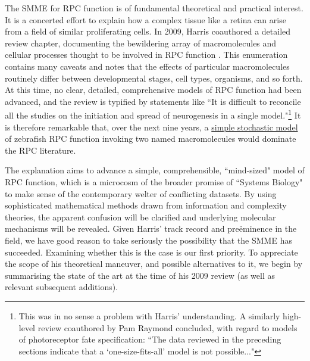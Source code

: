 The SMME for RPC function is of fundamental theoretical and practical interest. It is a concerted effort to explain how a complex tissue like a retina can arise from a field of similar proliferating cells. In 2009, Harris coauthored a detailed review chapter, documenting the bewildering array of macromolecules and cellular processes thought to be involved in RPC function \cite{Agathocleous2009}. This enumeration contains many caveats and notes that the effects of particular macromolecules routinely differ between developmental stages, cell types, organisms, and so forth. At this time, no clear, detailed, comprehensive models of RPC function had been advanced, and the review is typified by statements like ``It is difficult to reconcile all the studies on the initiation and spread of neurogenesis in a single model."\footnote{This was in no sense a problem with Harris' understanding. A similarly high-level review coauthored by Pam Raymond \cite{Adler2008} concluded, with regard to models of photoreceptor fate specification: ``The data reviewed in the preceding sections indicate that a ‘one-size-fits-all’ model is not possible..."} It is therefore remarkable that, over the next nine years, a \hyperref[ssec:SSM]{simple stochastic model} of zebrafish RPC function invoking two named macromolecules would dominate the RPC literature.

The explanation aims to advance a simple, comprehensible, ``mind-sized" model of RPC function, which is a microcosm of the broader promise of ``Systems Biology" to make sense of the contemporary welter of conflicting datasets. By using sophisticated mathematical methods drawn from information and complexity theories, the apparent confusion will be clarified and underlying molecular mechanisms will be revealed. Given Harris' track record and pre\"{e}minence in the field, we have good reason to take seriously the possibility that the SMME has succeeded. Examining whether this is the case is our first priority. To appreciate the scope of his theoretical maneuver, and possible alternatives to it, we begin by summarising the state of the art at the time of his 2009 review (as well as relevant subsequent additions).

